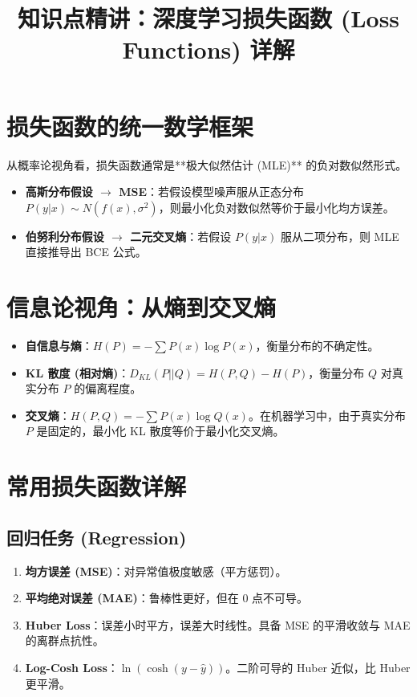 \documentclass[12pt, a4paper]{article}
\title{知识点精讲：深度学习损失函数 (Loss Functions) 详解}
\author{}
\date{}
\begin{document}
\maketitle

\section{损失函数的统一数学框架}
从概率论视角看，损失函数通常是**极大似然估计 (MLE)** 的负对数似然形式。
\begin{itemize}
    \item \textbf{高斯分布假设 $\to$ MSE}：若假设模型噪声服从正态分布 $P(y|x) \sim N(f(x), \sigma^2)$，则最小化负对数似然等价于最小化均方误差。
    \item \textbf{伯努利分布假设 $\to$ 二元交叉熵}：若假设 $P(y|x)$ 服从二项分布，则 MLE 直接推导出 BCE 公式。
\end{itemize}

\section{信息论视角：从熵到交叉熵}
\begin{itemize}
    \item \textbf{自信息与熵}：$H(P) = -\sum P(x) \log P(x)$，衡量分布的不确定性。
    \item \textbf{KL 散度 (相对熵)}：$D_{KL}(P||Q) = H(P, Q) - H(P)$，衡量分布 $Q$ 对真实分布 $P$ 的偏离程度。
    \item \textbf{交叉熵}：$H(P, Q) = -\sum P(x) \log Q(x)$。在机器学习中，由于真实分布 $P$ 是固定的，最小化 KL 散度等价于最小化交叉熵。
\end{itemize}

\section{常用损失函数详解}

\subsection{回归任务 (Regression)}
\begin{enumerate}
    \item \textbf{均方误差 (MSE)}：对异常值极度敏感（平方惩罚）。
    \item \textbf{平均绝对误差 (MAE)}：鲁棒性更好，但在 0 点不可导。
    \item \textbf{Huber Loss}：误差小时平方，误差大时线性。具备 MSE 的平滑收敛与 MAE 的离群点抗性。
    \item \textbf{Log-Cosh Loss}：$\ln(\cosh(y - \hat{y}))$。二阶可导的 Huber 近似，比 Huber 更平滑。
\end{enumerate}
\end{document}
